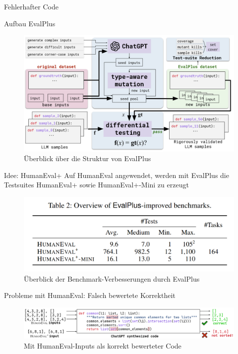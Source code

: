 \documentclass{beamer}              %
\begin{document}
\begin{frame}{Fehlerhafter Code}
\begin{frame}{Aufbau EvalPlus}
    \begin{figure}
        \centering
        \includegraphics[width=0.8\paperwidth]{images/overviewEplus.png}
        \caption{Überblick über die Struktur von EvalPlus\cite{chen2021evaluating}}
    \end{figure}
\end{frame}

\begin{frame}{Idee: HumanEval+}
Auf HumanEval angewendet, werden mit EvalPlus die Testsuites HumanEval+ sowie HumanEval+-Mini zu erzeugt
    \begin{figure}
        \centering
        \includegraphics[width=0.6\paperwidth]{images/humanevalbenchmarkbulk.png}
        \caption{Überblick der Benchmark-Verbesserungen durch EvalPlus\cite{liu2024your}}
    \end{figure}
\end{frame}

\begin{frame}{Probleme mit HumanEval: Falsch bewertete Korrektheit}
    \begin{figure}
        \centering
        \includegraphics[width=0.8\paperwidth]{images/sortedlistwrong.png}
        \caption{Mit HumanEval-Inputs als korrekt bewerteter Code\cite{liu2024your}}
    \end{figure}
\end{frame}


\end{frame}
\end{document}

